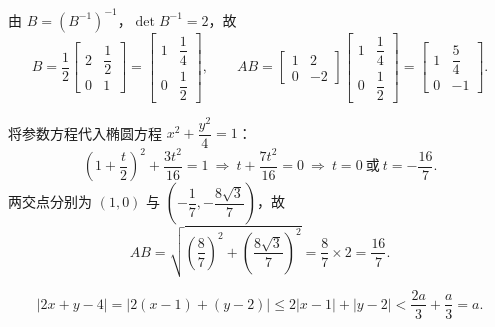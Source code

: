 \begin{answer}
由 \(B=(B^{-1})^{-1}\)，\(\det B^{-1}=2\)，故
\nopagebreak[4]
\[
B=\frac{1}{2}\begin{bmatrix}2&\dfrac{1}{2}\\0&1\end{bmatrix}=\begin{bmatrix}1&\dfrac{1}{4}\\0&\dfrac{1}{2}\end{bmatrix},
\qquad
AB=\begin{bmatrix}1&2\\0&-2\end{bmatrix}\begin{bmatrix}1&\dfrac{1}{4}\\0&\dfrac{1}{2}\end{bmatrix}=\begin{bmatrix}1&\dfrac{5}{4}\\0&-1\end{bmatrix}.
\]


将参数方程代入椭圆方程 \(x^{2}+\dfrac{y^{2}}{4}=1\)：
\nopagebreak[4]
\[
\left(1+\frac{t}{2}\right)^{2}+\frac{3t^{2}}{16}=1
\ \Longrightarrow\
t+\frac{7t^{2}}{16}=0
\ \Longrightarrow\
t=0\ \text{或}\ t=-\frac{16}{7}.
\]
两交点分别为 \((1,0)\) 与 \(\left(-\dfrac{1}{7},-\dfrac{8\sqrt{3}}{7}\right)\)，故
\nopagebreak[4]
\[
AB=\sqrt{\left(\frac{8}{7}\right)^{2}+\left(\frac{8\sqrt{3}}{7}\right)^{2}}=\frac{8}{7}\times2=\frac{16}{7}.
\]


\nopagebreak[4]
\[
|2x+y-4|=|2(x-1)+(y-2)|\leqslant2|x-1|+|y-2|<\frac{2a}{3}+\frac{a}{3}=a.
\]


\end{answer}
